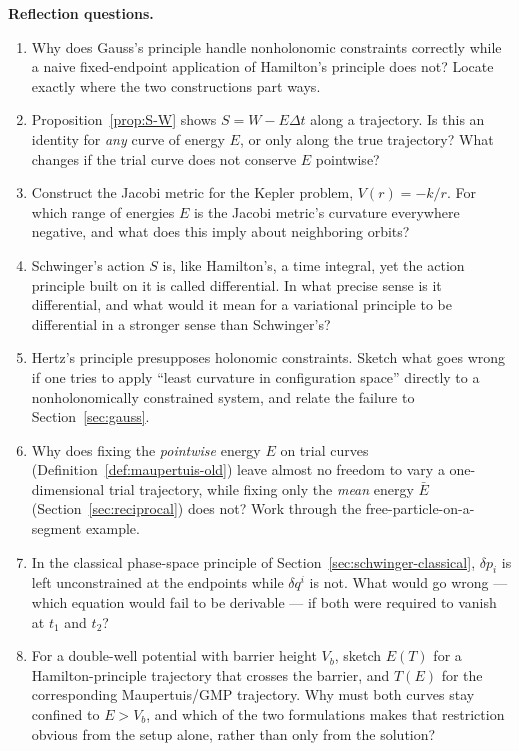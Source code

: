 \documentclass[11pt]{book}
\theoremstyle{definition}
\theoremstyle{plain}
\theoremstyle{remark}
\begin{document}
\begin{reflectionbox}
\textbf{Reflection questions.}
\begin{enumerate}[itemsep=2pt]
\item Why does Gauss's principle handle nonholonomic constraints correctly while a naive fixed-endpoint application of Hamilton's principle does not? Locate exactly where the two constructions part ways.
\item Proposition~\ref{prop:S-W} shows $S=W-E\Delta t$ along a trajectory. Is this an identity for \emph{any} curve of energy $E$, or only along the true trajectory? What changes if the trial curve does not conserve $E$ pointwise?
\item Construct the Jacobi metric for the Kepler problem, $V(r)=-k/r$. For which range of energies $E$ is the Jacobi metric's curvature everywhere negative, and what does this imply about neighboring orbits?
\item Schwinger's action $S$ is, like Hamilton's, a time integral, yet the action principle built on it is called differential. In what precise sense is it differential, and what would it mean for a variational principle to be differential in a stronger sense than Schwinger's?
\item Hertz's principle presupposes holonomic constraints. Sketch what goes wrong if one tries to apply ``least curvature in configuration space'' directly to a nonholonomically constrained system, and relate the failure to Section~\ref{sec:gauss}.
\item Why does fixing the \emph{pointwise} energy $E$ on trial curves (Definition~\ref{def:maupertuis-old}) leave almost no freedom to vary a one-dimensional trial trajectory, while fixing only the \emph{mean} energy $\bar E$ (Section~\ref{sec:reciprocal}) does not? Work through the free-particle-on-a-segment example.
\item In the classical phase-space principle of Section~\ref{sec:schwinger-classical}, $\delta p_i$ is left unconstrained at the endpoints while $\delta q^i$ is not. What would go wrong --- which equation would fail to be derivable --- if both were required to vanish at $t_1$ and $t_2$?
\item For a double-well potential with barrier height $V_b$, sketch $E(T)$ for a Hamilton-principle trajectory that crosses the barrier, and $T(E)$ for the corresponding Maupertuis/GMP trajectory. Why must both curves stay confined to $E>V_b$, and which of the two formulations makes that restriction obvious from the setup alone, rather than only from the solution?

\end{enumerate}
\end{reflectionbox}
\end{document}
